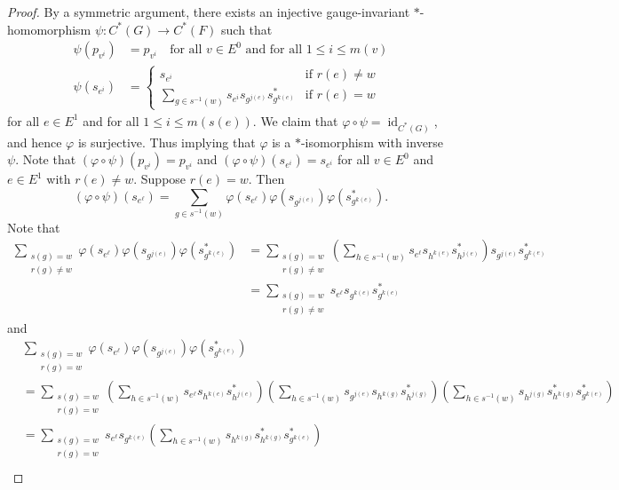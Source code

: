 \documentclass[12pt]{amsbook}%
\renewcommand{\phi}{\varphi}
\theoremstyle{defin}
\theoremstyle{remark}
\numberwithin{equation}{chapter}
\numberwithin{theor}{section}
\newcommand{\id}{\operatorname{id}}
\begin{document}
\begin{proof}
By a symmetric argument, there exists an injective gauge-invariant $*$-homomorphism $\psi \colon C^*(G) \to C^*(F)$ such that 
\begin{align*}
\psi ( p_{v^{i}} ) &= p_{v^i} \quad \text{for all $v \in E^0$ and for all $1 \leq i \leq m(v)$} \\
\psi ( s_{e^{i}}) &= 
\begin{cases}
s_{e^i} &\text{if } r(e) \neq w \\
\displaystyle\sum_{ g \in s^{-1} (w) } s_{e^i} s_{g^{j(e)}} s_{ g^{k(e)}}^* &\text{if  } r(e)=w
\end{cases}
\end{align*}
for all $e \in E^1$ and for all $1 \leq i \leq m ( s (e) )$.  We claim that $\phi \circ \psi = \id_{C^*(G)}$, and hence $\phi$ is surjective.  Thus implying that $\phi$ is a $*$-isomorphism with inverse $\psi$.  Note that $( \phi \circ \psi )( p_{v^i } ) = p_{v^i}$ and $( \phi \circ \psi )( s_{e^i } ) = s_{e^i}$ for all $v \in E^0$ and $e \in E^1$ with $r(e) \neq w$.  Suppose $r(e)=w$.    Then 
\[
( \phi \circ \psi )( s_{ e^\ell } )= \sum_{ g \in s^{-1} (w) }  \phi ( s_{e^\ell} ) \phi ( s_{ g^{j(e)} } ) \phi ( s_{ g^{k(e)}}^* ).
\]
Note that 
\begin{align*}
\sum_{ \substack{ s(g)=w \\  r(g)\neq w}  }  \phi ( s_{e^\ell} ) \phi ( s_{ g^{j(e)} } ) \phi ( s_{ g^{k(e)}}^* )  &=\sum_{ \substack{ s(g)=w \\  r(g)\neq w}  } \left( \sum_{ h \in s^{-1} (w) } s_{e^\ell } s_{ h^{k(e)} } s_{h^{j(e)}}^* \right) s_{ g^{j(e)} } s_{ g^{k(e)} }^* \\
&= \sum_{ \substack{ s(g)=w \\  r(g)\neq w}  }  s_{e^\ell} s_{g^{k(e)}} s_{g^{k(e)}}^*
\end{align*}
and 
\begin{align*}
&\sum_{ \substack{ s(g)=w \\  r(g)= w}  }  \phi ( s_{e^\ell} ) \phi ( s_{ g^{j(e)} } ) \phi ( s_{ g^{k(e)}}^* ) \\
&= \sum_{ \substack{ s(g)=w  \\ r(g)= w }} \left( \sum_{ h \in s^{-1} (w) } s_{e^\ell } s_{ h^{k(e)} } s_{h^{j(e)}}^* \right)   \left( \sum_{ h \in s^{-1} (w) } s_{g^{j(e)} } s_{ h^{k(g)} } s_{h^{j(g)}}^* \right)  \left( \sum_{ h \in s^{-1} (w) } s_{h^{j(g)}}  s_{ h^{k(g)} }^* s_{g^{k(e)} }^*  \right)  \\
&=\sum_{ \substack{ s(g)=w \\  r(g)= w}  }s_{e^\ell } s_{ g^{k(e)} }   \left( \sum_{ h \in s^{-1} (w) }  s_{ h^{k(g)} } s_{ h^{k(g)} }^* s_{g^{k(e)} }^*  \right) \\

\end{align*}
\end{proof}
\end{document}
